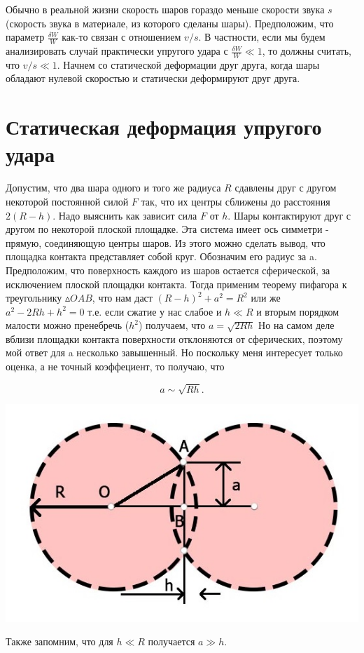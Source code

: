 \documentclass[a4paper]{article}
\begin{document}
Обычно в реальной жизни скорость шаров гораздо меньше скорости звука $s$ (скорость звука в материале, из которого сделаны шары). Предположим, что параметр $\frac{\delta W}{W}$ как-то связан с отношением $v/s$. В частности, если мы будем анализировать случай практически упругого удара с $\frac{\delta W}{W} \ll 1$, то должны считать, что $v/s \ll 1$. Начнем со статической деформации друг друга, когда шары обладают нулевой скоростью и статически деформируют друг друга.
\section{Статическая деформация упругого удара}
Допустим, что два шара одного и того же радиуса $R$ сдавлены друг с другом некоторой постоянной силой $F$ так, что их центры сближены до расстояния $2(R-h)$. Надо выяснить как зависит сила $F$ от $h$.
Шары контактируют друг с другом по некоторой плоской площадке. Эта система имеет ось симметри - прямую, соединяющую центры шаров. Из этого можно сделать вывод, что площадка контакта представляет собой круг. Обозначим его радиус за a. Предположим, что поверхность каждого из шаров остается сферической, за исключением плоской площадки контакта. Тогда применим теорему пифагора к треугольнику $\vartriangle OAB$, что нам даст 
$(R-h)^2+a^2=R^2$
или же 
$a^2-2Rh+h^2=0$
т.е. если сжатие у нас слабое и $h \ll R$ и вторым порядком малости можно пренебречь ($h^2$) получаем, что $a = \sqrt{2Rh}$
Но на самом деле вблизи площадки контакта поверхности отклоняются от сферических, поэтому мой ответ для a несколько завышенный. Но поскольку меня интересует только оценка, а не точный коэффециент, то получаю, что

\begin{equation}
a \sim \sqrt{Rh}.
\label{eq1}
\end{equation}

\begin{center}
\includegraphics[scale=0.5]{vpv-image.jpg}
\end{center}
Также запомним, что для $h \ll R$ получается $a \gg h$.
\end{document}
